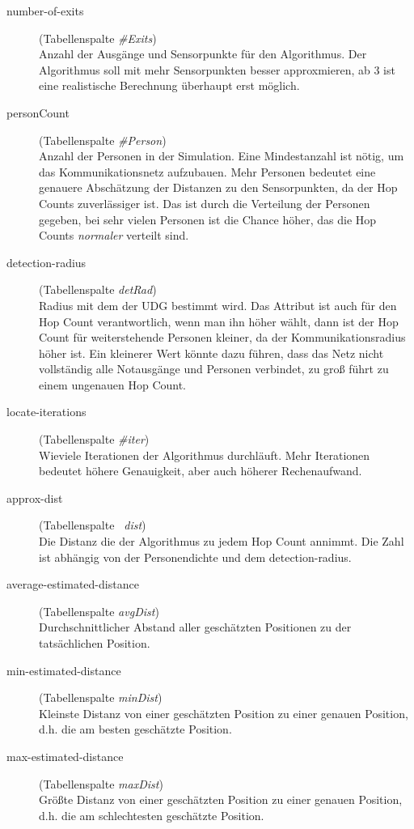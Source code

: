 \begin{description}
   \item[number-of-exits] (Tabellenspalte \emph{\#Exits}) \hfill \\
	Anzahl der Ausgänge und Sensorpunkte für den Algorithmus. Der Algorithmus soll mit mehr Sensorpunkten besser approxmieren, ab 3 ist eine realistische Berechnung überhaupt erst möglich.
   \item[personCount] (Tabellenspalte \emph{\#Person}) \hfill \\
	Anzahl der Personen in der Simulation. Eine Mindestanzahl ist nötig, um das Kommunikationsnetz aufzubauen. Mehr Personen bedeutet eine genauere Abschätzung der Distanzen zu den Sensorpunkten, da der Hop Counts zuverlässiger ist. Das ist durch die Verteilung der Personen gegeben, bei sehr vielen Personen ist die Chance höher, das die Hop Counts \emph{normaler} verteilt sind.
   \item[detection-radius] (Tabellenspalte \emph{detRad}) \hfill \\
	Radius mit dem der UDG bestimmt wird. Das Attribut ist auch für den Hop Count verantwortlich, wenn man ihn höher wählt, dann ist der Hop Count für weiterstehende Personen kleiner, da der Kommunikationsradius höher ist. Ein kleinerer Wert könnte dazu führen, dass das Netz nicht vollständig alle Notausgänge und Personen verbindet, zu groß führt zu einem ungenauen Hop Count.
   \item[locate-iterations] (Tabellenspalte \emph{\#iter}) \hfill \\
	Wieviele Iterationen der Algorithmus durchläuft. Mehr Iterationen bedeutet höhere Genauigkeit, aber auch höherer Rechenaufwand.
   \item[approx-dist] (Tabellenspalte \emph{~dist}) \hfill \\
	Die Distanz die der Algorithmus zu jedem Hop Count annimmt. Die Zahl ist abhängig von der Personendichte und dem detection-radius.
   \item[average-estimated-distance] (Tabellenspalte \emph{avgDist}) \hfill \\
	Durchschnittlicher Abstand aller geschätzten Positionen zu der tatsächlichen Position. 
   \item[min-estimated-distance] (Tabellenspalte \emph{minDist}) \hfill \\
	Kleinste Distanz von einer geschätzten Position zu einer genauen Position, d.h. die am besten geschätzte Position.
   \item[max-estimated-distance] (Tabellenspalte \emph{maxDist}) \hfill \\
	Größte Distanz von einer geschätzten Position zu einer genauen Position, d.h. die am schlechtesten geschätzte Position.
\end{description}

